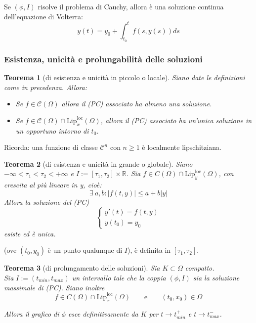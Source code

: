 \documentclass[a4paper,12pt]{article}
\newcommand{\cont}{\mathscr{C}}
\newtheorem{teo}{Teorema}
\begin{document}
Se $\left(\phi,I\right)$ risolve il problema di Cauchy, allora è una soluzione continua dell'equazione di Volterra:
$$ y\left(t\right) = y_0 + \displaystyle\int^t_{t_0} f\left(s,y\left(s\right)\right) ds $$

\subsubsection{Esistenza, unicità e prolungabilità delle soluzioni}

\begin{teo}[di esistenza e unicità in piccolo o locale]
Siano date le definizioni come in precedenza. Allora:
\begin{itemize}
 \item Se $f \in \cont \left(\Omega\right)$ allora il (PC) associato ha almeno una soluzione.
 \item Se $f \in \cont \left(\Omega\right) \cap \text{Lip}^{\text{loc}}_x\left(\Omega\right)$, allora il (PC) associato ha un'unica soluzione in un opportuno intorno di $t_0$.\\
\end{itemize}
\end{teo}
Ricorda: una funzione di classe $\cont^n$ con $ n \geq 1 $ è localmente lipschitziana. 

\begin{teo}[di esistenza e unicità in grande o globale]
Siano $-\infty < \tau_1 < \tau_2 < +\infty$ e $I:=\left[\tau_1,\tau_2\right]\times\mathbb{R}$. Sia $f \in C\left(\Omega\right) \cap \text{Lip}^{\text{loc}}_y\left(\Omega\right)$, con crescita al più lineare in y, cioè:
$$\exists\ a,b: |f \left(t,y\right)|\leq a + b|y|$$
Allora la soluzione del (PC)
$$\begin{cases} y'(t)=f\left(t,y\right) \\ y\left(t_0\right)=y_0 \end{cases}$$
esiste ed è unica.
\end{teo}

(ove $\left(t_0,y_0\right)$ è un punto qualunque di $I$), è definita in $\left[\tau_1,\tau_2\right]$.

\begin{teo}[di prolungamento delle soluzioni]
Sia $K\subset \Omega$ compatto.\\ Sia $I:=(t_{min},t_{max})$ un intervallo tale che la coppia $\left(\phi,I\right)$ sia la soluzione massimale di (PC).
Siano inoltre $$f \in C\left(\Omega\right) \cap \text{Lip}^{\text{loc}}_x\left(\Omega\right)\qquad \text{e} \qquad\left(t_0,x_0\right) \in \Omega$$


Allora il grafico di $\phi$ esce definitivamente da $K$ per $t\rightarrow t^+_{min}$ e $t\rightarrow t^-_{max}$.
\end{teo}
\end{document}
